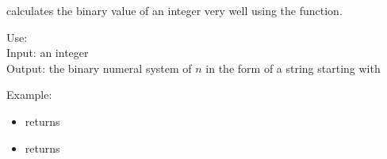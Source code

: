 \documentclass[11pt,class=report,crop=false]{standalone}
\begin{document}
\begin{cours}

\Python{} calculates the binary value of an integer very well using the  function.
  
   \begin{fonctionpython}
    Use: \\
    Input: an integer \\
    Output: the binary numeral system of $n$ in the form of a string starting with 
  
  \medskip
     
   Example:
  \begin{itemize}  
    \item {} returns 
    \item {} returns 
  \end{itemize} 
  \end{fonctionpython}  
   
\end{cours}
\end{document}
